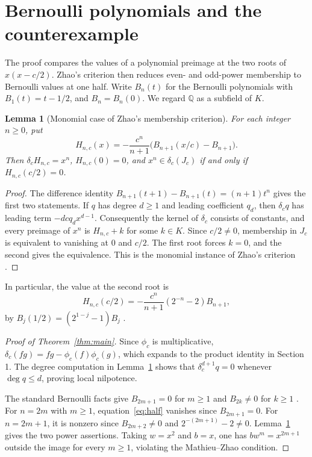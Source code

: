 \documentclass[11pt]{article}
\newtheorem{lemma}[theorem]{Lemma}
\newcommand{\Q}{\mathbb{Q}}
\begin{document}
\section{Bernoulli polynomials and the counterexample}


The proof compares the values of a polynomial preimage at the two
roots of $x(x-c/2)$. Zhao's criterion then reduces even- and odd-power
membership to Bernoulli values at one half. Write $B_n(t)$ for the
Bernoulli polynomials with $B_1(t)=t-1/2$, and $B_n=B_n(0)$.
We regard $\Q$ as a subfield of $K$.

\begin{lemma}[Monomial case of Zhao's membership criterion]\label{lem:membership}
For each integer $n\ge0$, put
\[
 H_{n,c}(x)=-\frac{c^n}{n+1}\bigl(B_{n+1}(x/c)-B_{n+1}\bigr).
\]
Then $\delta_c H_{n,c}=x^n$, $H_{n,c}(0)=0$, and
$x^n\in\delta_c(J_c)$ if and only if $H_{n,c}(c/2)=0$.
\end{lemma}
\begin{proof}
The difference identity $B_{n+1}(t+1)-B_{n+1}(t)=(n+1)t^n$
\cite[Eq.~24.4.1]{dlmf} gives the first two statements. If $q$ has degree
$d\ge1$ and leading coefficient $q_d$, then $\delta_c q$ has leading
term $-dc q_d x^{d-1}$. Consequently the kernel of $\delta_c$ consists
of constants, and every preimage of $x^n$ is $H_{n,c}+k$ for some $k\in K$.
Since $c/2\ne0$, membership in $J_c$ is equivalent to vanishing at $0$
and $c/2$.
The first root forces $k=0$, and the second gives the equivalence.
This is the monomial instance of Zhao's criterion
\cite[Lemma~4.5 and Corollary~4.6]{zhao-univariate}.
\end{proof}

In particular, the value at the second root is
\begin{equation}\label{eq:half}
 H_{n,c}(c/2)=-\frac{c^n}{n+1}(2^{-n}-2)B_{n+1},
\end{equation}
by $B_j(1/2)=(2^{1-j}-1)B_j$ \cite[Eq.~24.4.27]{dlmf}.

\begin{proof}[Proof of Theorem~\ref{thm:main}]
Since $\phi_c$ is multiplicative,
$\delta_c(fg)=fg-\phi_c(f)\phi_c(g)$, which expands to the
product identity in Section 1.
The degree computation in Lemma~\ref{lem:membership} shows that
$\delta_c^{d+1}q=0$ whenever $\deg q\le d$, proving local nilpotence.

The standard Bernoulli facts give $B_{2m+1}=0$ for $m\ge1$ and
$B_{2k}\ne0$ for $k\ge1$ \cite[Eq.~24.2.2]{dlmf}.
For $n=2m$ with $m\ge1$, equation~\eqref{eq:half} vanishes since
$B_{2m+1}=0$. For $n=2m+1$, it is nonzero since $B_{2m+2}\ne0$ and
$2^{-(2m+1)}-2\ne0$. Lemma~\ref{lem:membership} gives the two power
assertions. Taking $w=x^2$ and $b=x$, one has $bw^m=x^{2m+1}$ outside
the image for every $m\ge1$, violating the Mathieu--Zhao condition.
\end{proof}
\end{document}
